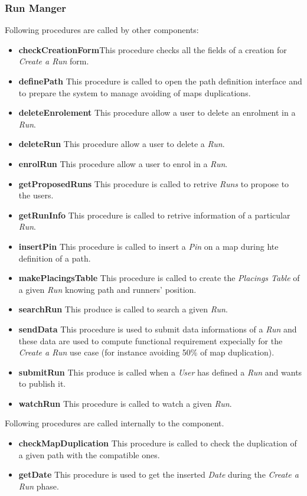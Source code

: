 \subsubsection{Run Manger}
Following procedures are called by other components:
\begin{itemize}
  \item \textbf{checkCreationForm}\quad This procedure checks all the fields of a creation for \textit{Create a Run} form.
  \item \textbf{definePath} \quad This procedure is called to open the path definition interface and to prepare the system to manage avoiding of maps duplications.
  \item \textbf{deleteEnrolement} \quad This procedure allow a user to delete an enrolment in a \textit{Run}.
  \item \textbf{deleteRun} \quad This procedure allow a user to delete a \textit{Run}.
  \item \textbf{enrolRun} \quad This procedure allow a user to enrol in a \textit{Run}.
  \item \textbf{getProposedRuns} \quad This procedure is called to retrive \textit{Runs} to propose to the users.
  \item \textbf{getRunInfo} \quad This procedure is called to retrive information of a particular \textit{Run}.
  \item \textbf{insertPin} \quad This procedure is called to insert a \textit{Pin} on a map during hte definition of a path.
  \item \textbf{makePlacingsTable} \quad This procedure is called to create the \textit{Placings Table} of a given \textit{Run} knowing path and runners' position.
  \item \textbf{searchRun} \quad This produce is called to search a given \textit{Run}.
  \item \textbf{sendData} \quad This procedure is used to submit data informations of a \textit{Run} and these data are used to compute functional requirement expecially for the \textit{Create a Run} use case (for instance avoiding 50\% of map duplication).
  \item \textbf{submitRun} \quad This produce is called when a \textit{User} has defined a \textit{Run} and wants to publish it.
  \item \textbf{watchRun} \quad This procedure is called to watch a given \textit{Run}.
\end{itemize}

\myparagraph{}
Following procedures are called internally to the component.
\begin{itemize}
  \item \textbf{checkMapDuplication} \quad This procedure is called to check the duplication of a given path with the compatible ones.
  \item \textbf{getDate} \quad This procedure is used to get the inserted \textit{Date} during the \textit{Create a Run} phase.
\end{itemize}

